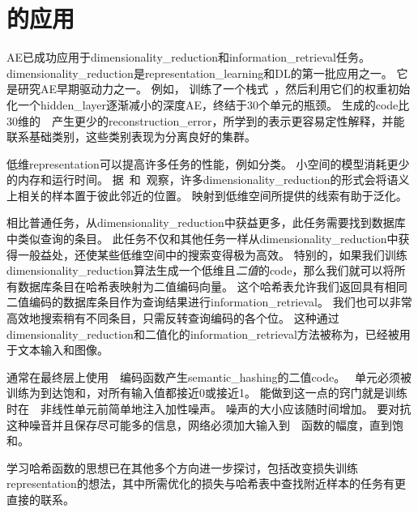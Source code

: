 
\section{的应用}
\label{sec:applications_of_autoencoders}

\gls{AE}已成功应用于\gls{dimensionality_reduction}和\gls{information_retrieval}任务。
\gls{dimensionality_reduction}是\gls{representation_learning}和\gls{DL}的第一批应用之一。
它是研究\gls{AE}早期驱动力之一。
例如， \citet{Hinton-Science2006}训练了一个栈式~，然后利用它们的权重初始化一个\gls{hidden_layer}逐渐减小的深度\gls{AE}，终结于30个单元的瓶颈。
生成的\gls{code}比30维的~~产生更少的\gls{reconstruction_error}，所学到的表示更容易定性解释，并能联系基础类别，这些类别表现为分离良好的集群。


低维\gls{representation}可以提高许多任务的性能，例如分类。
小空间的模型消耗更少的内存和运行时间。
据~\citet{Salakhutdinov+Hinton2007-small}和~\citet{Torralba+Fergus+Weiss-2008}观察，许多\gls{dimensionality_reduction}的形式会将语义上相关的样本置于彼此邻近的位置。
映射到低维空间所提供的线索有助于泛化。


相比普通任务，从\gls{dimensionality_reduction}中获益更多，此任务需要找到数据库中类似查询的条目。
此任务不仅和其他任务一样从\gls{dimensionality_reduction}中获得一般益处，还使某些低维空间中的搜索变得极为高效。
特别的，如果我们训练\gls{dimensionality_reduction}算法生成一个低维且\emph{二值}的\gls{code}，那么我们就可以将所有数据库条目在哈希表映射为二值编码向量。
这个哈希表允许我们返回具有相同二值编码的数据库条目作为查询结果进行\gls{information_retrieval}。
我们也可以非常高效地搜索稍有不同条目，只需反转查询编码的各个位。
这种通过\gls{dimensionality_reduction}和二值化的\gls{information_retrieval}方法被称为\citep{Salakhutdinov+Hinton2007-small,Salakhutdinov+Geoff-2009}，已经被用于文本输入\citep{Salakhutdinov+Hinton2007-small,Salakhutdinov+Geoff-2009}和图像\citep{Torralba+Fergus+Weiss-2008,WeissTF08,KrizhevskyH11}。


通常在最终层上使用~~编码函数产生\gls{semantic_hashing}的二值\gls{code}。
~单元必须被训练为到达饱和，对所有输入值都接近0或接近1。
能做到这一点的窍门就是训练时在~~非线性单元前简单地注入加性噪声。
噪声的大小应该随时间增加。
要对抗这种噪音并且保存尽可能多的信息，网络必须加大输入到~~函数的幅度，直到饱和。


学习哈希函数的思想已在其他多个方向进一步探讨，包括改变损失训练\gls{representation}的想法，其中所需优化的损失与哈希表中查找附近样本的任务有更直接的联系\citep{Norouzi+Fleet-ICML2011}。
